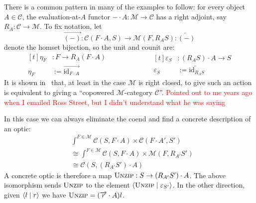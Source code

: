 \documentclass[11pt,letterpaper]{article}
\theoremstyle{plain}
\theoremstyle{definition}
\newcommand{\C}{\mathscr{C}}
\newcommand{\M}{\mathscr{M}}
\newcommand{\id}{\mathrm{id}}
\newcommand{\act}{\cdot}
\newcommand{\rep}[2]{{\ensuremath \left\langle #1 \mid #2 \right\rangle}}
\newcommand{\funzip}{\textsc{Unzip}}
\newcommand{\todo}[1]{\textcolor{red}{\small #1}}
\begin{document}
There is a common pattern in many of the examples to follow: for every object $A \in \C$, the evaluation-at-$A$ functor $- \act A : \M \to \C$ has a right adjoint, say $R_A : \C \to \M$. To fix notation, let \[\overrightarrow{(-)} : \C(F \act A, S) \to \M(F, R_{A} S) : \overleftarrow{(-)}\] denote the homset bijection, so the unit and counit are:
    \begin{equation*}
    \begin{aligned}[t]
  	\eta_F &: F \to R_A (F \act A) \\
    \eta_F &:= \overrightarrow{\id_{F \act A}}
    \end{aligned}
    \qquad\qquad\qquad
    \begin{aligned}[t]
    \varepsilon_{S} &: (R_A S) \cdot A \to S \\
    \varepsilon_{S} &:= \overleftarrow{\id_{R_{A} S}}
    \end{aligned}
\end{equation*}
It is shown in~\cite[Section 6]{ANoteOnActions} that, at least in the case $\M$ is right closed, to give such an action is equivalent to giving a ``copowered $\M$-category $\C$''. \todo{Pointed out to me years ago when I emailed Ross Street, but I didn't understand what he was saying}

In this case we can always eliminate the coend and find a concrete description of an optic:
\begin{align*}
&\int^{F \in \M} \C(S, F\act A) \times \C(F\act A', S') \\
&\cong \int^{F \in \M} \C(S, F \act A) \times \M(F, R_{A'} S') \\
&\cong \C(S,  (R_{A'} S') \act A)
\end{align*}
A concrete optic is therefore a map $\funzip : S \to (R_{A'} S') \act A$. The above isomorphism sends $\funzip$ to the element $\rep{\funzip}{\varepsilon_{S'}}$. In the other direction, given $\rep{l}{r}$ we have $\funzip = (\overrightarrow{r} \act A)l$.
\end{document}
